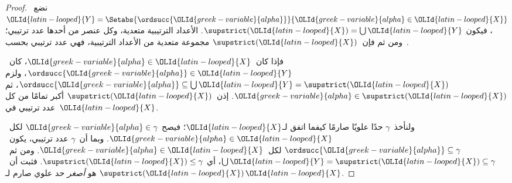 \documentclass[../../../include/open-logic-section]{subfiles}
\begin{document}
\begin{proof}
نضع~${\OLId{latin-looped}{Y}} = \Setabs{\ordsucc{{\OLId{greek-variable}{alpha}}}}{{\OLId{greek-variable}{alpha}} \in {\OLId{latin-looped}{X}}}$، فيكون
$\supstrict({\OLId{latin-looped}{X}}) = \bigcup {\OLId{latin-looped}{Y}}$. الأعداد الترتيبية متعدية، وكل عنصر
من أحدها عدد ترتيبي؛ ومن ثم فإن~$\supstrict({\OLId{latin-looped}{X}})$ مجموعة متعدية من
الأعداد الترتيبية، فهي عدد ترتيبي بحسب~.

فإذا كان~${\OLId{greek-variable}{alpha}} \in {\OLId{latin-looped}{X}}$، كان~$\ordsucc{{\OLId{greek-variable}{alpha}}} \in {\OLId{latin-looped}{Y}}$، ولزم
$\ordsucc{{\OLId{greek-variable}{alpha}}} \subseteq \bigcup {\OLId{latin-looped}{Y}} = \supstrict({\OLId{latin-looped}{X}})$، ثم
${\OLId{greek-variable}{alpha}} \in \supstrict({\OLId{latin-looped}{X}})$. إذن~$\supstrict({\OLId{latin-looped}{X}})$ أكبر تمامًا من
كل عدد ترتيبي في~${\OLId{latin-looped}{X}}$.

ولنأخذ~$\gamma$ حدًا علويًا صارمًا كيفما اتفق لـ${\OLId{latin-looped}{X}}$؛ فيصح
${\OLId{greek-variable}{alpha}} \in \gamma$ لكل~${\OLId{greek-variable}{alpha}} \in {\OLId{latin-looped}{X}}$. وبما أن~$\gamma$ عدد
ترتيبي، يكون~$\ordsucc{{\OLId{greek-variable}{alpha}}} \subseteq \gamma$ لكل~${\OLId{greek-variable}{alpha}} \in {\OLId{latin-looped}{X}}$.
ومن ثم~$\bigcup {\OLId{latin-looped}{Y}} = \supstrict({\OLId{latin-looped}{X}}) \subseteq \gamma$، أي
$\supstrict({\OLId{latin-looped}{X}}) \leq \gamma$. فثبت أن~$\supstrict({\OLId{latin-looped}{X}})$ هو \emph{أصغر}
حد علوي صارم لـ${\OLId{latin-looped}{X}}$.
\end{proof}
\end{document}
